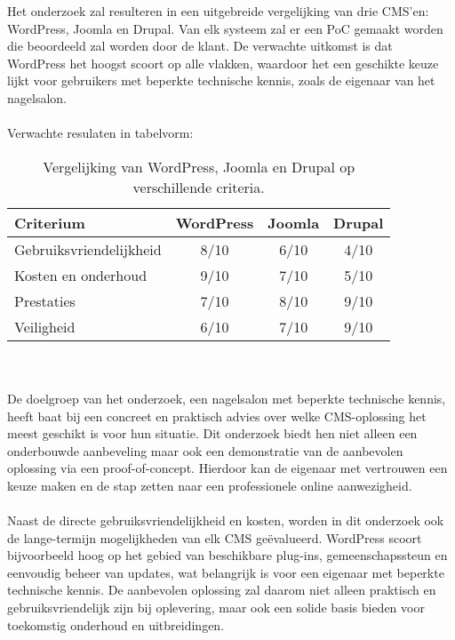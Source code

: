 \noindent
Het onderzoek zal resulteren in een uitgebreide vergelijking van drie CMS'en: WordPress, Joomla en Drupal. Van elk systeem zal er een PoC gemaakt worden die beoordeeld zal worden door de klant. De verwachte uitkomst is dat WordPress het hoogst scoort op alle vlakken, waardoor het een geschikte keuze lijkt voor gebruikers met beperkte technische kennis, zoals de eigenaar van het nagelsalon.
\\ \\
Verwachte resulaten in tabelvorm:
\begin{table}[h!]
    \centering
    \begin{tabular}{lccc}
        \toprule
        Criterium            & WordPress & Joomla & Drupal \\
        \midrule
        Gebruiksvriendelijkheid & 8/10      & 6/10   & 4/10   \\
        Kosten en onderhoud   & 9/10      & 7/10   & 5/10   \\
        Prestaties            & 7/10      & 8/10   & 9/10   \\
        Veiligheid            & 6/10      & 7/10   & 9/10   \\
        \bottomrule
    \end{tabular}
    \caption{Vergelijking van WordPress, Joomla en Drupal op verschillende criteria.}
    \label{tab:cms-comparison}
\end{table}
\\ \\ 
De doelgroep van het onderzoek, een nagelsalon met beperkte technische kennis, heeft baat bij een concreet en praktisch advies over welke CMS-oplossing het meest geschikt is voor hun situatie. Dit onderzoek biedt hen niet alleen een onderbouwde aanbeveling maar ook een demonstratie van de aanbevolen oplossing via een proof-of-concept. Hierdoor kan de eigenaar met vertrouwen een keuze maken en de stap zetten naar een professionele online aanwezigheid.
\\ \\ 
Naast de directe gebruiksvriendelijkheid en kosten, worden in dit onderzoek ook de lange-termijn mogelijkheden van elk CMS geëvalueerd. WordPress scoort bijvoorbeeld hoog op het gebied van beschikbare plug-ins, gemeenschapssteun en eenvoudig beheer van updates, wat belangrijk is voor een eigenaar met beperkte technische kennis. De aanbevolen oplossing zal daarom niet alleen praktisch en gebruiksvriendelijk zijn bij oplevering, maar ook een solide basis bieden voor toekomstig onderhoud en uitbreidingen.